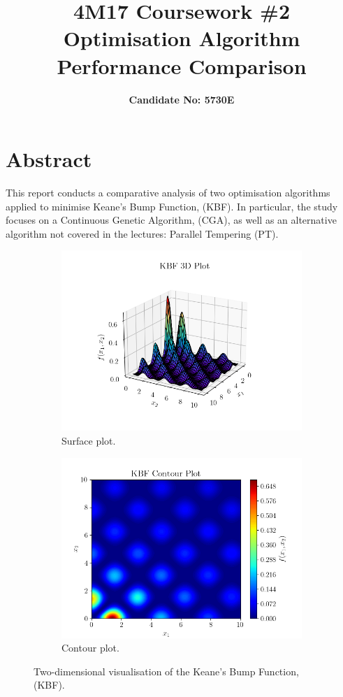 \documentclass[10pt]{article}
\title{\textbf{4M17 Coursework \#2 \\ Optimisation Algorithm Performance Comparison}}
\author{\textbf{Candidate No: 5730E}}
\begin{document}
\maketitle
\section{Abstract}
This report conducts a comparative analysis of two optimisation algorithms applied to minimise Keane's Bump Function, (KBF). In particular, the study focuses on a Continuous Genetic Algorithm, (CGA), as well as an alternative algorithm not covered in the lectures: Parallel Tempering (PT). 

\begin{figure}[H]
\centering
\begin{subfigure}{0.49\textwidth}
    \centering
    \includegraphics[width=\textwidth]{../figures/KBF/KBF_surf.png}
    \caption{Surface plot.}
    \label{fig:KBF_surf}
\end{subfigure}
\begin{subfigure}{0.49\textwidth}
    \centering
    \includegraphics[width=\textwidth]{../figures/KBF/KBF_contour.png}
    \caption{Contour plot.}
    \label{fig:KBF_contour}
\end{subfigure}
    \captionsetup{justification=centering}
    \caption{Two-dimensional visualisation of the Keane's Bump Function, (KBF).}
    \label{fig:KBF_2D}
\end{figure}
\end{document}
